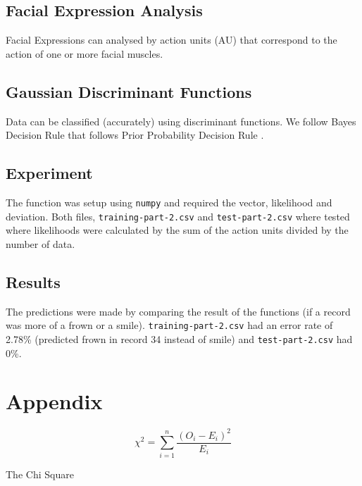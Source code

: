 \documentclass[12pt,a4paper]{article}
\newcommand{\code}[1]{\texttt{#1}}
\begin{document}
\subsection*{Facial Expression Analysis}

Facial Expressions can analysed by action units (AU) that correspond to the action of one or more facial muscles.

\subsection*{Gaussian Discriminant Functions}

Data can be classified (accurately) using discriminant functions. We follow Bayes Decision Rule that follows Prior Probability Decision Rule \cite{MLAIVP}.

\subsection*{Experiment}

The function was setup using \code{numpy} and required the vector, likelihood and deviation. Both files, \code{training-part-2.csv} and \code{test-part-2.csv} where tested where likelihoods were calculated by the sum of the action units divided by the number of data.

\subsection*{Results}

The predictions were made by comparing the result of the functions (if a record was more of a frown or a smile). \code{training-part-2.csv} had an error rate of 2.78\% (predicted frown in record 34 instead of smile) and \code{test-part-2.csv} had 0\%.

\printbibliography

\newpage


\section*{Appendix}

\vspace{3cm}

\begin{listing}[h]

\[{\chi}^2=\sum_{i=1}^{n} \frac{(O_i - E_i)^2}{E_i}\]
\caption{The Chi Square}

\end{listing}
\end{document}
